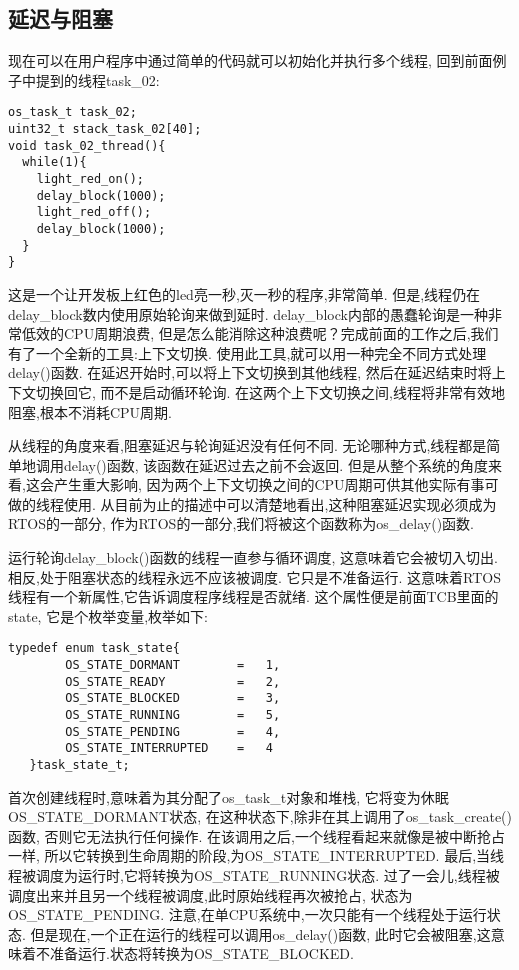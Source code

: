 \subsection{延迟与阻塞}
现在可以在用户程序中通过简单的代码就可以初始化并执行多个线程,
回到前面例子中提到的线程task\_02:
\begin{lstlisting}[language={[ANSI]C},keywordstyle=\color{blue!70},commentstyle=\color{red!50!green!50!blue!50},frame=shadowbox, rulesepcolor=\color{red!20!green!20!blue!20}]
os_task_t task_02;
uint32_t stack_task_02[40];
void task_02_thread(){
  while(1){
    light_red_on();
    delay_block(1000);
    light_red_off();
    delay_block(1000);
  }
}
\end{lstlisting}
这是一个让开发板上红色的led亮一秒,灭一秒的程序,非常简单.
但是,线程仍在delay\_block数内使用原始轮询来做到延时.
delay\_block内部的愚蠢轮询是一种非常低效的CPU周期浪费,
但是怎么能消除这种浪费呢？完成前面的工作之后,我们有了一个全新的工具:上下文切换.
使用此工具,就可以用一种完全不同方式处理delay()函数.
在延迟开始时,可以将上下文切换到其他线程,
然后在延迟结束时将上下文切换回它,
而不是启动循环轮询.
在这两个上下文切换之间,线程将非常有效地阻塞,根本不消耗CPU周期.

从线程的角度来看,阻塞延迟与轮询延迟没有任何不同.
无论哪种方式,线程都是简单地调用delay()函数,
该函数在延迟过去之前不会返回.
但是从整个系统的角度来看,这会产生重大影响,
因为两个上下文切换之间的CPU周期可供其他实际有事可做的线程使用.
从目前为止的描述中可以清楚地看出,这种阻塞延迟实现必须成为RTOS的一部分,
作为RTOS的一部分,我们将被这个函数称为os\_delay()函数.

运行轮询delay\_block()函数的线程一直参与循环调度,
这意味着它会被切入切出.
相反,处于阻塞状态的线程永远不应该被调度. 
它只是不准备运行.
这意味着RTOS线程有一个新属性,它告诉调度程序线程是否就绪.
这个属性便是前面TCB里面的state,
它是个枚举变量,枚举如下:
\begin{lstlisting}[language={[ANSI]C},keywordstyle=\color{blue!70},commentstyle=\color{red!50!green!50!blue!50},frame=shadowbox, rulesepcolor=\color{red!20!green!20!blue!20}]
    typedef	enum task_state{
        OS_STATE_DORMANT 		=	1,
        OS_STATE_READY 			= 	2,
        OS_STATE_BLOCKED 		= 	3,
        OS_STATE_RUNNING 		= 	5,
        OS_STATE_PENDING 		= 	4,
        OS_STATE_INTERRUPTED 	= 	4
   }task_state_t;
\end{lstlisting}

首次创建线程时,意味着为其分配了os\_task\_t对象和堆栈,
它将变为休眠OS\_STATE\_DORMANT状态,
在这种状态下,除非在其上调用了os\_task\_create()函数,
否则它无法执行任何操作.
在该调用之后,一个线程看起来就像是被中断抢占一样,
所以它转换到生命周期的阶段,为OS\_STATE\_INTERRUPTED.
最后,当线程被调度为运行时,它将转换为OS\_STATE\_RUNNING状态.
过了一会儿,线程被调度出来并且另一个线程被调度,此时原始线程再次被抢占,
状态为OS\_STATE\_PENDING.
注意,在单CPU系统中,一次只能有一个线程处于运行状态.
但是现在,一个正在运行的线程可以调用os\_delay()函数,
此时它会被阻塞,这意味着不准备运行.状态将转换为OS\_STATE\_BLOCKED.

